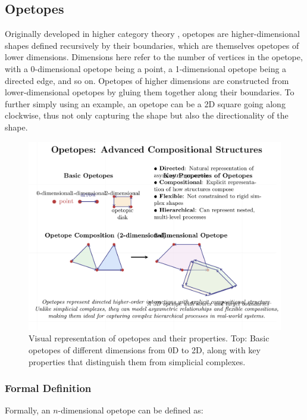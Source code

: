 \subsection{Opetopes}

Originally developed in higher category theory \citep{cheng2004higher, kock2010polynomial}, opetopes are higher-dimensional shapes defined recursively by their boundaries, which are themselves opetopes of lower dimensions. Dimensions here refer to the number of vertices in the opetope, with a 0-dimensional opetope being a point, a 1-dimensional opetope being a directed edge, and so on. Opetopes of higher dimensions are constructed from lower-dimensional opetopes by gluing them together along their boundaries. To further simply using an example, an opetope can be a 2D square going along clockwise, thus not only capturing the shape but also the directionality of the shape.

\begin{figure}[htbp]
    \centering
    \includegraphics[width=\textwidth]{figures/opetope_structures-1.png}
    \caption{Visual representation of opetopes and their properties. Top: Basic opetopes of different dimensions from 0D to 2D, along with key properties that distinguish them from simplicial complexes.}
    \label{fig:opetope_structures}
\end{figure}

\subsubsection{Formal Definition}

Formally, an $n$-dimensional opetope can be defined as:

